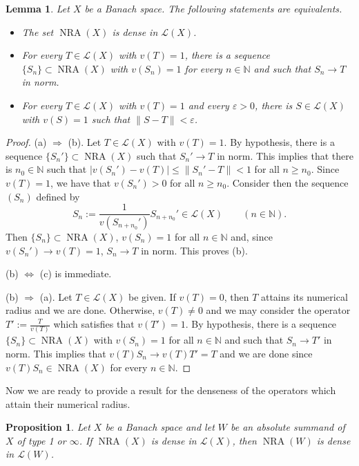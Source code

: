 \documentclass[10pt,a4paper]{amsart}
\theoremstyle{plain}
\newtheorem{prop}[theorem]{Proposition}
\newtheorem{lemma}[theorem]{Lemma}
\theoremstyle{definition}
\newcommand{\N}{\mathbb{N}}
\newcommand{\eps}{\varepsilon}
\DeclareMathOperator{\NRA}{NRA}
\renewcommand{\leq}{\leqslant}
\renewcommand{\geq}{\geqslant}
\begin{document}
\begin{lemma} \label{lemmaNRA} Let $X$ be a Banach space. The following statements are equivalents.
\begin{itemize}
\item[(a)] The set $\NRA(X)$ is dense in $\mathcal{L}(X)$.
\item[(b)] For every $T \in \mathcal{L}(X)$ with $v(T) = 1$, there is a sequence $\{S_n\} \subset \NRA(X)$ with $v(S_n) = 1$ for every $n \in \N$ and such that $S_n \longrightarrow T$ in norm.
\item[(c)] For every $T \in \mathcal{L}(X)$ with $v(T) = 1$ and every $\eps>0$, there is $S \in \mathcal{L}(X)$ with $v(S) = 1$ such that $\|S - T\| < \eps$.	
\end{itemize}	
\end{lemma}

\begin{proof} (a) $\Rightarrow$ (b). Let $T \in \mathcal{L}(X)$ with $v(T) = 1$. By hypothesis, there is a sequence $\{S_n'\} \subset \NRA(X)$ such that $S_n' \longrightarrow T$ in norm. This implies that there is $n_0 \in \N$ such that $|v(S_n') - v(T)| \leq \|S_n' - T\| < 1$ for all $n \geq n_0$. Since $v(T) = 1$, we have that $v(S_n') > 0$ for all $n \geq n_0$. Consider then the sequence $(S_n)$ defined by $$S_n := \frac{1}{v(S_{n+n_0}')}S_{n+n_0}' \in \mathcal{L}(X) \qquad (n\in \N).$$ Then $\{S_n\} \subset \NRA(X)$, $v(S_n) = 1$ for all $n \in \N$ and, since $v(S_n') \longrightarrow v(T) = 1$, $S_n \longrightarrow T$ in norm. This proves (b).
	
\noindent
(b) $\Leftrightarrow$ (c) is immediate.

\noindent
(b) $\Rightarrow$ (a). Let $T \in \mathcal{L}(X)$ be given. If $v(T) = 0$, then $T$ attains its numerical radius and we are done. Otherwise, $v(T) \not= 0$ and we may consider the operator $T' := \frac{T}{v(T)}$ which satisfies that $v(T') = 1$. By hypothesis, there is a sequence $\{S_n\} \subset \NRA(X)$ with $v(S_n) = 1$ for all $n \in \N$ and such that $S_n \longrightarrow T'$ in norm. This implies that $v(T) S_n \longrightarrow v(T)T'=T$ and we are done since $v(T) S_n \in \NRA(X)$ for every $n \in \N$.
\end{proof}


Now we are ready to provide a result for the denseness of the operators which attain their numerical radius.

\begin{prop} \label{NRA1} Let $X$ be a Banach space and let $W$ be an absolute summand of $X$ of type 1 or $\infty$. If $\NRA(X)$ is dense in $\mathcal{L}(X)$, then $\NRA(W)$ is dense in $\mathcal{L}(W)$.
\end{prop}
\end{document}
